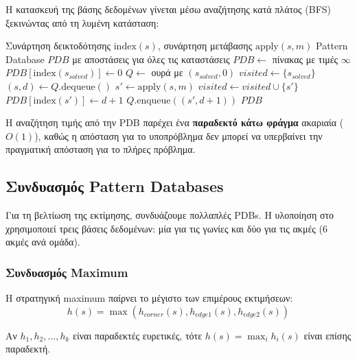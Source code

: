 Η κατασκευή της βάσης δεδομένων γίνεται μέσω αναζήτησης κατά πλάτος (BFS) ξεκινώντας από τη λυμένη κατάσταση:

\begin{algorithm}[H]
\caption{Κατασκευή Pattern Database μέσω BFS}
\label{alg:pdb-construction}
\begin{algorithmic}[1]
\Require Συνάρτηση δεικτοδότησης $\text{index}(s)$, συνάρτηση μετάβασης $\text{apply}(s, m)$
\Ensure Pattern Database $PDB$ με αποστάσεις για όλες τις καταστάσεις
\State $PDB \gets$ πίνακας με τιμές $\infty$
\State $PDB[\text{index}(s_{solved})] \gets 0$
\State $Q \gets$ ουρά με $(s_{solved}, 0)$
\State $visited \gets \{s_{solved}\}$
    \State $(s, d) \gets Q.\text{dequeue}()$
        \State $s' \gets \text{apply}(s, m)$
            \State $visited \gets visited \cup \{s'\}$
            \State $PDB[\text{index}(s')] \gets d + 1$
            \State $Q.\text{enqueue}((s', d + 1))$
        \EndIf
    \EndFor
\EndWhile
\State \Return $PDB$
\end{algorithmic}
\end{algorithm}

Η αναζήτηση τιμής από την PDB παρέχει ένα \textbf{παραδεκτό κάτω φράγμα} ακαριαία ($O(1)$), καθώς η απόσταση για το υποπρόβλημα δεν μπορεί να υπερβαίνει την πραγματική απόσταση για το πλήρες πρόβλημα.

\subsection{Συνδυασμός Pattern Databases}
\label{subsec:pdb-combining}

Για τη βελτίωση της εκτίμησης, συνδυάζουμε πολλαπλές PDBs. Η υλοποίηση στο  χρησιμοποιεί τρεις βάσεις δεδομένων: μία για τις γωνίες και δύο για τις ακμές (6 ακμές ανά ομάδα).

\subsubsection{Συνδυασμός Maximum}

Η στρατηγική maximum παίρνει το μέγιστο των επιμέρους εκτιμήσεων:
\begin{equation}
h(s) = \max(h_{corner}(s), h_{edge1}(s), h_{edge2}(s))
\end{equation}

\begin{theorem}
Αν $h_1, h_2, \ldots, h_k$ είναι παραδεκτές ευρετικές, τότε $h(s) = \max_i h_i(s)$ είναι επίσης παραδεκτή.
\end{theorem}

